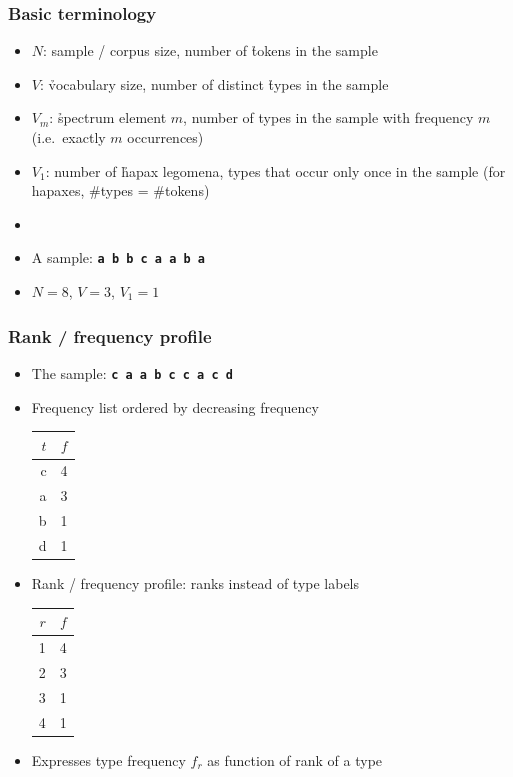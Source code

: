 \documentclass[handout,notes=show,t]{beamer} %
\begin{document}
\begin{frame}
 \frametitle{Basic terminology}

  \begin{itemize}
  \item $N$: sample / corpus size, number of \h{tokens} in the sample
  \item $V$: \h{vocabulary} size, number of distinct \h{types} in the sample
  \item $V_m$: \h{spectrum element} $m$, number of types in the sample with
    frequency $m$ (i.e.\ exactly $m$ occurrences)
  \item $V_1$: number of \h{hapax legomena}, types that occur only once in the
    sample (for hapaxes, \#types = \#tokens)
  \item[]
  \item A sample: \texttt{\textbf{a b b c a a b a}}
  \item $N = 8$, $V = 3$, $V_1 = 1$
  \end{itemize}
\end{frame}

\begin{frame}
\frametitle{Rank / frequency profile}

  \begin{itemize}
  \item The sample: \texttt{\textbf{c a a b c c a c d}}
  \item Frequency list ordered by decreasing frequency
    \begin{center}
      \begin{tabular}{r|r}
        $t$ & $f$\\
        \hline
        c & 4\\
        a & 3\\
        b & 1\\
        d & 1
      \end{tabular}
    \end{center}
    \pause
  \item Rank / frequency profile: ranks instead of type labels
    \begin{center}
      \begin{tabular}{r|r}
        $r$ & $f$\\
        \hline
        1 & 4\\
        2 & 3\\
        3 & 1\\
        4 & 1
      \end{tabular}
    \end{center}
  \item Expresses type frequency $f_r$ as function of rank of a type
  \end{itemize}

\end{frame}
\end{document}
